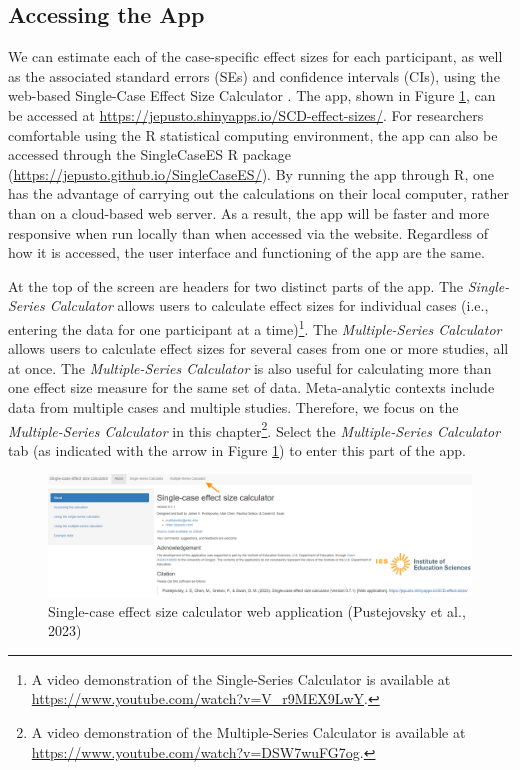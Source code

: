 \documentclass[
]{book}
\begin{document}
\hypertarget{accessing-the-app}{%
\subsection{Accessing the App}\label{accessing-the-app}}

We can estimate each of the case-specific effect sizes for each participant, as well as the associated standard errors (SEs) and confidence intervals (CIs), using the web-based Single-Case Effect Size Calculator \citep{pustejovsky2023SingleCaseES}. The app, shown in Figure \ref{fig:SCDES}, can be accessed at \url{https://jepusto.shinyapps.io/SCD-effect-sizes/}. For researchers comfortable using the R statistical computing environment, the app can also be accessed through the SingleCaseES R package (\url{https://jepusto.github.io/SingleCaseES/}). By running the app through R, one has the advantage of carrying out the calculations on their local computer, rather than on a cloud-based web server. As a result, the app will be faster and more responsive when run locally than when accessed via the website. Regardless of how it is accessed, the user interface and functioning of the app are the same.

At the top of the screen are headers for two distinct parts of the app. The \emph{Single-Series Calculator} allows users to calculate effect sizes for individual cases (i.e., entering the data for one participant at a time)\footnote{A video demonstration of the Single-Series Calculator is available at \url{https://www.youtube.com/watch?v=V_r9MEX9LwY}.}. The \emph{Multiple-Series Calculator} allows users to calculate effect sizes for several cases from one or more studies, all at once. The \emph{Multiple-Series Calculator} is also useful for calculating more than one effect size measure for the same set of data. Meta-analytic contexts include data from multiple cases and multiple studies. Therefore, we focus on the \emph{Multiple-Series Calculator} in this chapter\footnote{A video demonstration of the Multiple-Series Calculator is available at \url{https://www.youtube.com/watch?v=DSW7wuFG7og}.}. Select the \emph{Multiple-Series Calculator} tab (as indicated with the arrow in Figure \ref{fig:SCDES}) to enter this part of the app.

\begin{figure}
\includegraphics[width=0.75\linewidth]{images/SCDES} \caption{Single-case effect size calculator web application (Pustejovsky et al., 2023)}\label{fig:SCDES}
\end{figure}
\end{document}
